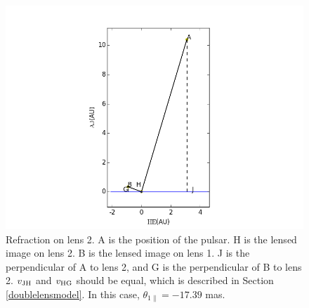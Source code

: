 \documentclass[useAMS,usenatbib]{mn2e}
\begin{document}
\begin{figure}
\centering
\includegraphics[width=1.0\linewidth,scale=1.0]{First_reflection.png}
\caption{Refraction on lens 2. 
A is the position of the pulsar. H is the lensed image on lens 2. B is the lensed image on lens 1. J is the perpendicular of A to lens 2, and G is the perpendicular of B to lens 2. $v_{\rm JH}$ and $v_{\rm HG}$ should be equal, which is described in Section \ref{doublelensmodel}. In this case, $\theta_{1\parallel} =-17.39$ mas.}
\label{first_reflect}
\end{figure}
\end{document}
